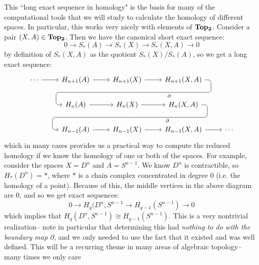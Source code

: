 \documentclass[11pt, oneside]{amsart}   	%
\theoremstyle{definition}
\begin{document}
This ``long exact sequence in homology" is the basis for many of the computational tools that we will study to calculate the 
homology of different spaces. In particular, this works very nicely with elements of $\bf{Top_2}$. Consider a pair $(X, A)\in 
\bf{Top_2}$. Then we have the canonical short exact sequence:
\begin{equation}
	0\rightarrow S_*(A)\rightarrow S_*(X)\rightarrow S_*(X, A)\rightarrow 0
\end{equation}
by definition of $S_*(X, A)$ as the quotient $S_*(X) / S_*(A)$, so we get a long exact sequence:
\begin{equation}\begin{tikzcd}
		\cdots\arrow[r] & H_{n + 1}(A)\arrow[r] & H_{n + 1}(X)\arrow[r] \arrow[d, phantom, ""{coordinate, name=Z}] & 
		H_{n + 1}(X, A) \arrow[dll, "\partial", rounded corners, 
		to path={ -- ([xshift=2ex]\tikztostart.east)
                |- (Z) [near end]\tikztonodes
                -| ([xshift=-2ex]\tikztotarget.west)
                -- (\tikztotarget)}] & \\
		& H_n(A)\arrow[r] & H_n(X)\arrow[r] \arrow[d, phantom, ""{coordinate, name=W}] & H_n(X, A) 
		\arrow[dll, "\partial", rounded corners, 
		to path={ -- ([xshift=2ex]\tikztostart.east)
                |- (W) [near end]\tikztonodes
                -| ([xshift=-2ex]\tikztotarget.west)
                -- (\tikztotarget)}] & \\
		 & H_{n - 1}(A)\arrow[r] & H_{n - 1}(X)\arrow[r] & H_{n - 1}(X, A)\arrow[r] & \cdots
\end{tikzcd}\end{equation}
which in many cases provides us a practical way to compute the reduced homology if we know the homology of one or both of 
the spaces. For example, consider the spaces $X = D^n$ and $A = S^{n - 1}$. We know $D^n$ is contractible, so $H_*(D^n) 
= *$, where $*$ is a chain complex concentrated in degree 0 (i.e. the homology of a point). Because of this, the middle 
vertices in the above diagram are 0, and so we get exact sequences:
\begin{equation}
	0\rightarrow H_q(D^n, S^{n - 1}\rightarrow H_{q - 1}(S^{n - 1})\rightarrow 0
\end{equation}
which implies that $H_q(D^n, S^{n - 1})\cong H_{q - 1}(S^{n - 1})$. This is a very nontrivial realization-- note in particular that 
determining this had \textit{nothing to do with the boundary map $\partial$}, and we only needed to use the fact that it 
existed and was well defined. This will be a recurring theme in many areas of algebraic topology-- many times we only care 
\end{document}
